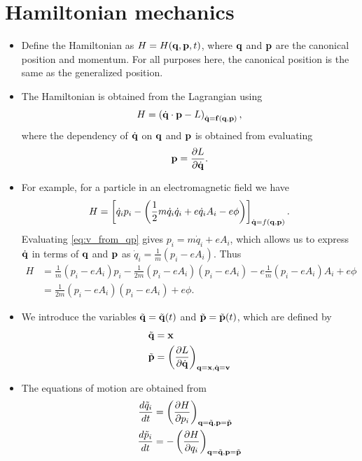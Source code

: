 \documentclass[oneside,a4paper,11pt]{report}
\newcommand{\qvecdot}{\dot{\qvec}}
\newcommand{\qdot}{\dot{q}}
\begin{document}
\section{Hamiltonian mechanics}
\begin{itemize}
\item Define the Hamiltonian as $H = H(\mathbf{q}, \mathbf{p}, t)$, where $\mathbf{q}$ and $\mathbf{p}$ are the canonical position and momentum. For all purposes here, the canonical position is the same as the generalized position.

\item The Hamiltonian is obtained from the Lagrangian using
\begin{equation}
H = \left ( \qvecdot \cdot \pvec - L \right)_{\qvecdot = \fvec(\qvec, \pvec)},
\end{equation} 
where the dependency of $\qvecdot$ on $\mathbf{q}$ and $\mathbf{p}$ is obtained from evaluating
\begin{equation}
\label{eq:v_from_qp}
\pvec = \frac{ \partial L}{\partial \qvecdot}.
\end{equation}

\item For example, for a particle in an electromagnetic field we have
\begin{equation}
H = \left [ \qdot_i p_i - \left ( \frac{1}{2} m \qdot_i \qdot_i + e \qdot_i A_i - e\phi \right ) \right]_{\qvecdot = f(\qvec, \pvec)}. 
\end{equation}
Evaluating \cref{eq:v_from_qp} gives $ p_i = m \qdot_i + e A_i $, which allows us to express $\qvecdot$ in terms of $\mathbf{q}$ and $\mathbf{p}$ as $\qdot_i = \frac{1}{m} (p_i - eA_i )$. Thus
\begin{align}
H &= \frac{1}{m} (p_i - eA_i)p_i - \frac{1}{2m} (p_i - eA_i) (p_i-eA_i) - e\frac{1}{m} (p_i -eA_i) A_i + e\phi \nonumber \\
& = \frac{1}{2m} (p_i -eA_i) (p_i -eA_i) + e\phi.
\end{align}

\item We introduce the variables $\tilde{\mathbf{q}} = \tilde{\mathbf{q}}(t)$ and $\tilde{\mathbf{p}} = \tilde{\mathbf{p}}(t)$, which are defined by
\begin{align}
\tilde{\qvec} &= \xvec \\ 
\tilde{\pvec} & = \left ( \frac{\partial L}{\partial \qvecdot} \right)_{\qvec = \xvec, \qvecdot = \vvec}
\end{align}

\item The equations of motion are obtained from
\begin{align}
\frac{d \tilde{q}_i}{dt} &= \left ( \frac{ \partial H}{\partial p_i} \right )_{\mathbf{q} = \tilde{\mathbf{q}}, \mathbf{p} = \tilde{\mathbf{p}}} \\
\frac{d \tilde{p}_i}{dt} & = -\left ( \frac{ \partial H}{\partial q_i} \right )_{\mathbf{q} = \tilde{\mathbf{q}}, \mathbf{p} = \tilde{\mathbf{p}}} \label{eq:hamil_p}
\end{align}


\end{itemize}
\end{document}
